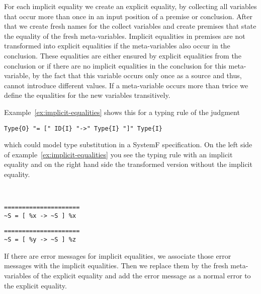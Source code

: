 For each implicit equality we create an explicit equality, by
collecting all variables that occur more than once in an input
position of a premise or conclusion. After that we create fresh names
for the collect variables and create premises that state the equality
of the fresh meta-variables. Implicit equalities in premises are not
transformed into explicit equalities if the meta-variables also occur
in the conclusion. These equalities are either ensured by explicit
equalities from the conclusion or if there are no implicit equalities
in the conclusion for this meta-variable, by the fact that this
variable occurs only once as a source and thus, cannot introduce
different values. If a meta-variable occurs more than twice we define
the equalities for the new variables transitively.

Example~\ref{ex:implicit-equalities} shows this for
a typing rule of the judgment

\begin{lstlisting}[language=sltc]
Type{O} "= [" ID{I} "->" Type{I} "]" Type{I}
\end{lstlisting}

which could model type substitution in a SystemF specification. On the
left side of example~\ref{ex:implicit-equalities} you see the typing
rule with an implicit equality and on the right hand side the
transformed version without the implicit equality.

\begin{example}{~}
\newline
  \begin{minipage}[b]{.45\linewidth}
    \begin{lstlisting}[language=sltc]
=====================
~S = [ %x -> ~S ] %x
\end{lstlisting}
  \end{minipage}
  \begin{minipage}[b]{.45\linewidth}
    \begin{lstlisting}[language=sltc]
%y = %z
=====================
~S = [ %y -> ~S ] %z
\end{lstlisting}
  \end{minipage}
\label{ex:implicit-equalities}
\end{example}

If there are error messages for implicit equalities, we associate
those error messages with the implicit equalities. Then we replace them
by the fresh meta-variables of the explicit equality and add the error
message as a normal error to the explicit equality.

